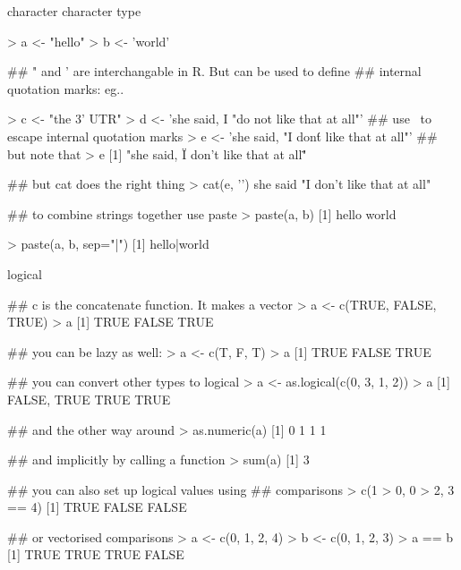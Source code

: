 \documentclass[pdf]{beamer}
\begin{document}
\begin{frame}[fragile]{character}
character type

\begin{rcode}
  > a <- "hello"
  > b <- 'world'

  ## " and ' are interchangable in R. But can be used to define
  ## internal quotation marks: eg..
  
  > c <- "the 3' UTR"
  > d <- 'she said, I "do not like that at all"'
  ## use \ to escape internal quotation marks
  > e <- 'she said, "I don\'t like that at all"'
  ## but note that
  > e
  [1] "she said, \"I don't like that at all\""
  
  ## but cat does the right thing
  > cat(e, '\n')
  she said "I don't like that at all"

  ## to combine strings together use paste
  > paste(a, b)
  [1] hello world

  > paste(a, b, sep="|")
  [1] hello|world
\end{rcode}
\end{frame}

\begin{frame}[fragile]{logical}
  \begin{rcode}
    ## c is the concatenate function. It makes a vector
    > a <- c(TRUE, FALSE, TRUE)
    > a
    [1] TRUE FALSE TRUE

    ## you can be lazy as well:
    > a <- c(T, F, T)
    > a
    [1] TRUE FALSE TRUE
    
    ## you can convert other types to logical
    > a <- as.logical(c(0, 3, 1, 2))
    > a
    [1] FALSE, TRUE TRUE TRUE
    
    ## and the other way around
    > as.numeric(a)
    [1] 0 1 1 1
    
    ## and implicitly by calling a function
    > sum(a)
    [1] 3
    
    ## you can also set up logical values using
    ## comparisons
    > c(1 > 0, 0 > 2, 3 == 4)
    [1] TRUE FALSE FALSE

    ## or vectorised comparisons
    > a <- c(0, 1, 2, 4)
    > b <- c(0, 1, 2, 3)
    > a == b
    [1] TRUE TRUE TRUE FALSE
  \end{rcode}
\end{frame}
\end{document}
